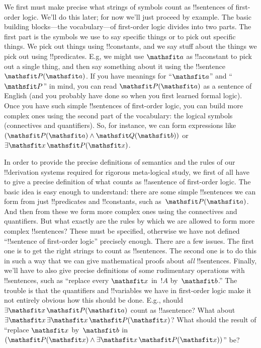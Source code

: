\documentclass[../../../include/open-logic-section]{subfiles}
\begin{document}


We first must make precise what strings of symbols count as
!!{sentence}s of first-order logic.  We'll do this later; for now
we'll just proceed by example.  The basic building blocks---the
vocabulary---of first-order logic divides into two parts. The first
part is the symbols we use to say specific things or to pick out
specific things. We pick out things using !!{constant}s, and we say
stuff about the things we pick out using !!{predicate}s.  E.g, we
might use $\Obj a$ as !!a{constant} to pick out a single thing, and
then say something about it using the !!{sentence}~$\Atom{\Obj P}{\Obj
a}$.  If you have meanings for ``$\Obj a$'' and ``$\Obj P$'' in mind,
you can read $\Atom{\Obj P}{\Obj a}$ as a sentence of English (and you
probably have done so when you first learned formal logic).  Once you
have such simple !!{sentence}s of first-order logic, you can build
more complex ones using the second part of the vocabulary: the logical
symbols (connectives and quantifiers). So, for instance, we can form
expressions like $(\Atom{\Obj P}{\Obj a} \land \Atom{\Obj Q}{\Obj b})$
or~$\lexists[\Obj x][\Atom{\Obj P}{\Obj x}]$.

In order to provide the precise definitions of semantics and the rules
of our !!{derivation} systems required for rigorous meta-logical study, we
first of all have to give a precise definition of what counts as
!!a{sentence} of first-order logic. The basic idea is easy enough to
understand: there are some simple !!{sentence}s we can form from just
!!{predicate}s and !!{constant}s, such as~$\Atom{\Obj P}{\Obj a}$. And
then from these we form more complex ones using the connectives and
quantifiers. But what exactly are the rules by which we are allowed to
form more complex !!{sentence}s?  These must be specified, otherwise
we have not defined ``!!{sentence} of first-order logic'' precisely
enough. There are a few issues. The first one is to get the right
strings to count as !!{sentence}s. The second one is to do this in
such a way that we can give mathematical proofs about \emph{all}
!!{sentence}s. Finally, we'll have to also give precise definitions of
some rudimentary operations with !!{sentence}s, such as ``replace
every $\Obj x$ in~$!A$ by~$\Obj b$.'' The trouble is that the
quantifiers and !!{variable}s we have in first-order logic make it not
entirely obvious how this should be done. E.g., should $\lexists[\Obj
x][\Atom{\Obj P}{\Obj a}]$ count as !!a{sentence}? What about
$\lexists[\Obj x][\lexists[\Obj x][\Atom{\Obj P}{\Obj x}]]$? What
should the result of ``replace $\Obj x$ by~$\Obj b$ in $(\Atom{\Obj
P}{\Obj x} \land \lexists[\Obj x][\Atom{\Obj P}{\Obj x}])$'' be?
\end{document}
